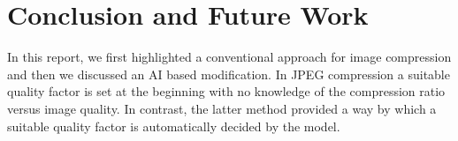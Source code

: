 \chapter{Conclusion and Future Work}

In this report, we first highlighted a conventional approach for image compression and then we discussed an AI based modification. In JPEG compression a suitable quality factor is set at the beginning with no knowledge of the compression ratio versus image quality. In contrast, the latter method provided a way by which a suitable quality factor is automatically decided by the model. 

